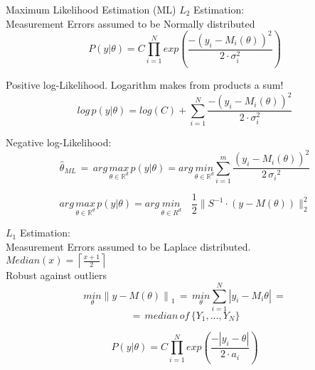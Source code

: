 \begin{tcolorbox}[colback=yellow!5!white,colframe=yellow!75!white,coltitle=black,title=\textbf{Maximum Likelihood Estimation}]
Maximum Likelihood Estimation (ML) \({L}_{2}\) Estimation:\\
Measurement Errors assumed to be Normally distributed
\begin{equation*}
{ P(y|\theta ) }=C\prod _{ i=1 }^{ N }{ exp(\frac { -(y_{ i }-M_{ i }(\theta ))^{ 2 } }{ 2\cdot \sigma _{ i }^{ 2 } } )} 
\end{equation*}

Positive log-Likelihood. Logarithm makes from products a sum!
\begin{equation*}
{ log \, p(y|\theta ) } = log(C) +\sum _{ i=1 }^{ N }{ { \frac { -(y_{ i }-M_{ i }(\theta ))^{ 2 } }{ 2 \cdot \sigma _{ i }^{ 2 } }  } } 
\end{equation*}

Negative log-Likelihood:
\begin{equation*}
\hat{\theta}_{ML} \, = \, arg \, \underset { \theta \in { \mathbb{R} }^{ d } }{ max } \, p(y|\theta ) = arg \, \underset { \theta \in { \mathbb{R} }^{ d } }{ min }  \sum _{ i=1 }^{ m }{ \frac { (y_{ i }-M_{ i }(\theta ))^{ 2 } }{ 2\, { \sigma _{ i } }^{ 2 } }  } 
\end{equation*}

\begin{equation*}
arg \, \underset{ \theta \in \mathbb{ R }^{ d } }{ max } \, p(y|\theta ) = arg \, \underset { \theta \in {  R }^{ d } }{ min } \quad \frac{1}{2} \parallel S^{ -1 }\cdot (y-M(\theta )){ \parallel  }_{ 2 }^{ 2 }
\end{equation*}

\({L}_{1}\) Estimation:\\
Measurement Errors assumed to be Laplace distributed.\\ \(Median(x)=\left\lceil \frac { x + 1 }{ 2 }  \right\rceil \)\\
Robust against outliers
\begin{equation*}
\underset { \theta  }{ min } { \parallel y-M(\theta )\parallel  }_{ 1 }\,=\,\underset { \theta  }{ min } \sum _{ i=1 }^{ N }{ |{ y }_{ i }-{ M }_{ i }\theta | } \,=
\end{equation*}
\begin{equation*}
=\,median\,of\,\{{Y}_{1},...,{Y}_{N}\}
\end{equation*}

\begin{equation*}
{ P(y|\theta ) }=C\prod _{ i=1 }^{ N }{ { exp }(\frac { -|{ y }_{ i }-\theta | }{ 2\cdot { a }_{ i } } ) } 
\end{equation*} 
\end{tcolorbox}

